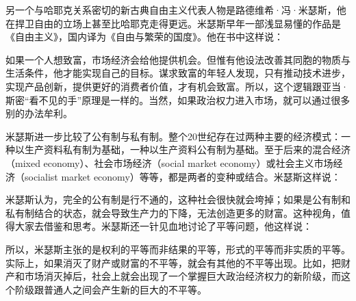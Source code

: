 另一个与哈耶克关系密切的新古典自由主义代表人物是路德维希·冯·米瑟斯，他在捍卫自由的立场上甚至比哈耶克走得更远。米瑟斯早年一部浅显易懂的作品是《自由主义》，国内译为《自由与繁荣的国度》。他在书中这样说：


如果一个人想致富，市场经济会给他提供机会。但惟有他设法改善其同胞的物质与生活条件，他才能实现自己的目标。谋求致富的年轻人发现，只有推动技术进步，实现产品创新，提供更好的消费者价值，才有机会致富。所以，这个逻辑跟亚当·斯密“看不见的手”原理是一样的。当然，如果政治权力进入市场，就可以通过很多别的办法牟利。

米瑟斯进一步比较了公有制与私有制。整个20世纪存在过两种主要的经济模式：一种以生产资料私有制为基础，一种以生产资料公有制为基础。至于后来的混合经济（mixed economy）、社会市场经济（social market economy）或社会主义市场经济（socialist market economy）等等，都是两者的变种或结合。米瑟斯这样说：


米瑟斯认为，完全的公有制是行不通的，这种社会很快就会垮掉；如果是公有制和私有制结合的状态，就会导致生产力的下降，无法创造更多的财富。这种视角，值得大家去借鉴和思考。米瑟斯还一针见血地讨论了平等问题，他这样说：


所以，米瑟斯主张的是权利的平等而非结果的平等，形式的平等而非实质的平等。实际上，如果消灭了财产或财富的不平等，就会有其他的不平等出现。比如，把财产和市场消灭掉后，社会上就会出现了一个掌握巨大政治经济权力的新阶级，而这个阶级跟普通人之间会产生新的巨大的不平等。


